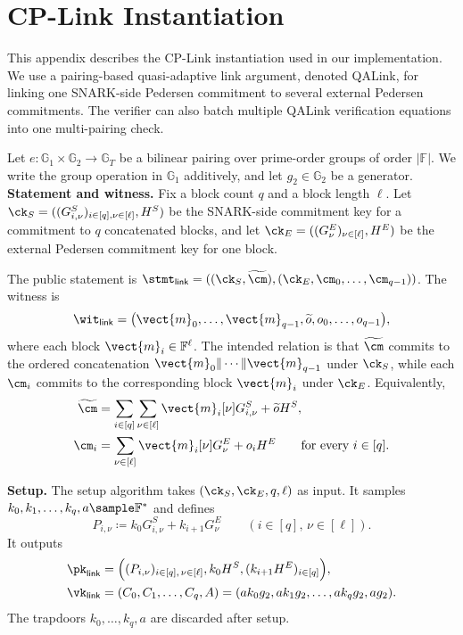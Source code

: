 \iffalse
\section{CP-Link Instantiation}
\label{app:cplink-instant}

This appendix describes the CP-Link instantiation used in our implementation.
We use a pairing-based quasi-adaptive link argument, denoted QALink, for
linking one SNARK-side Pedersen commitment to several external Pedersen
commitments.  The verifier can also batch multiple QALink verification
equations into one multi-pairing check.

Let \(e:\mathbb{G}_1\times\mathbb{G}_2\to\mathbb{G}_T\) be a bilinear pairing
over prime-order groups of order \(|\mathbb{F}|\).  We write the group
operation in \(\mathbb{G}_1\) additively, and let \(g_2\in\mathbb{G}_2\) be a
generator. \\

\noindent\textbf{Statement and witness.}
Fix a block count \(q\) and a block length \(\ell\).  Let
\(\ck_S=((G^S_{i,\nu})_{i\in[q],\nu\in[\ell]},H^S)\) be the SNARK-side
commitment key for a commitment to \(q\) concatenated blocks, and let
\(\ck_E=((G^E_{\nu})_{\nu\in[\ell]},H^E)\) be the external Pedersen commitment
key for one block.

The public statement is
\(\stmt_{\mathsf{link}}=((\ck_S,\widetilde{\cm}),
(\ck_E,\cm_0,\ldots,\cm_{q-1}))\).  The witness is
\[
  \wit_{\mathsf{link}}
  =
  \big(
    \vect{m}_0,\ldots,\vect{m}_{q-1},
    \widetilde{o},
    o_0,\ldots,o_{q-1}
  \big),
\]
where each block \(\vect{m}_i\in\mathbb{F}^{\ell}\).  The intended relation is
that \(\widetilde{\cm}\) commits to the ordered concatenation
\(\vect{m}_0\|\cdots\|\vect{m}_{q-1}\) under \(\ck_S\), while each
\(\cm_i\) commits to the corresponding block \(\vect{m}_i\) under \(\ck_E\).
Equivalently,
\[
\begin{aligned}
  \widetilde{\cm}
  &=
  \sum_{i\in[q]}\sum_{\nu\in[\ell]}
  \vect{m}_i[\nu]G^S_{i,\nu}
  +
  \widetilde{o}H^S, \\
  \cm_i
  &=
  \sum_{\nu\in[\ell]}
  \vect{m}_i[\nu]G^E_{\nu}
  +
  o_iH^E
  \qquad \text{for every } i\in[q].
\end{aligned}
\]

\noindent\textbf{Setup.}
The setup algorithm takes \((\ck_S,\ck_E,q,\ell)\) as input.  It samples
\(k_0,k_1,\ldots,k_q,a\sample\mathbb{F}^{\ast}\) and defines
\[
  P_{i,\nu} \coloneqq k_0G^S_{i,\nu}+k_{i+1}G^E_{\nu}
  \qquad
  (i\in[q],\,\nu\in[\ell]).
\]
It outputs
\[
\begin{aligned}
  \pk_{\mathsf{link}}
  &=
  \Big(
    (P_{i,\nu})_{i\in[q],\,\nu\in[\ell]},
    k_0H^S,
    (k_{i+1}H^E)_{i\in[q]}
  \Big), \\
  \vk_{\mathsf{link}}
  &=
  (C_0,C_1,\ldots,C_q,A)
  =
  (ak_0g_2,ak_1g_2,\ldots,ak_qg_2,ag_2).
\end{aligned}
\]
The trapdoors \(k_0,\ldots,k_q,a\) are discarded after setup. \\

